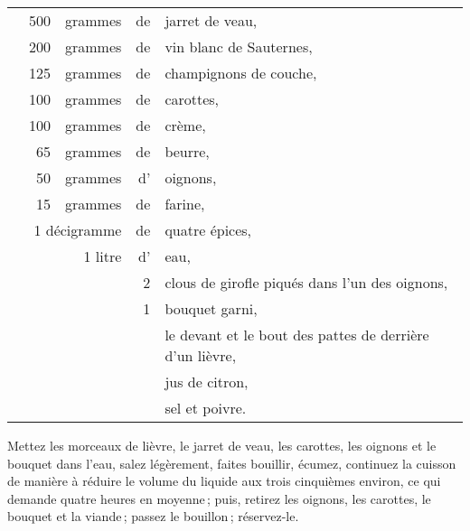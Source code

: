 \footnotesize
\begin{longtable}{rrrrp{16em}}   
  & 500 & grammes    & de & jarret de veau,                                                               \\
  & 200 & grammes    & de & vin blanc de Sauternes,                                                       \\
  & 125 & grammes    & de & champignons de couche,                                                        \\
  & 100 & grammes    & de & carottes,                                                                     \\
  & 100 & grammes    & de & crème,                                                                        \\
  &  65 & grammes    & de & beurre,                                                                       \\
  &  50 & grammes    & d’ & oignons,                                                                      \\
  &  15 & grammes    & de & farine,                                                                       \\
  & \multicolumn{2}{r}{1 décigramme}  & de & quatre épices,                                               \\ 
  &     & 1 litre    & d' & eau,                                                                          \\ 
  &     &            & 2  & clous de girofle piqués dans l'un des oignons,                                \\ 
  &     &            & 1  & bouquet garni,                                                                \\ 
  &     &            &    & le devant et le bout des pattes de derrière d'un lièvre,                      \\ 
  &     &            &    & jus de citron,                                                                \\ 
  &     &            &    & sel et poivre.                                                                \\ 
\end{longtable}
\normalsize
                                                                                                        
Mettez les morceaux de lièvre, le jarret de veau, les carottes, les oignons et
le bouquet dans l'eau, salez légèrement, faites bouillir, écumez, continuez la
cuisson de manière à réduire le volume du liquide aux trois cinquièmes environ,
ce qui demande quatre heures en moyenne ; puis, retirez les oignons, les
carottes, le bouquet et la viande ; passez le bouillon ; réservez-le.

